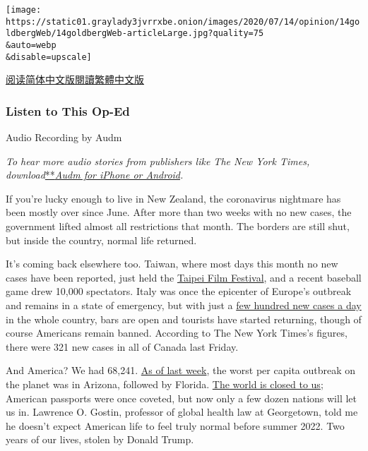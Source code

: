 \texttt{[image: https://static01.graylady3jvrrxbe.onion/images/2020/07/14/opinion/14goldbergWeb/14goldbergWeb-articleLarge.jpg?quality=75\\\&auto=webp\\\&disable=upscale]}

\href{https://cn.nytimes3xbfgragh.onion/opinion/20200714/us-coronavirus-trump/}{阅读简体中文版}\href{https://cn.nytimes3xbfgragh.onion/opinion/20200714/us-coronavirus-trump/zh-hant/}{閱讀繁體中文版}

\hypertarget{listen-to-this-op-ed}{%
\subsubsection{Listen to This Op-Ed}\label{listen-to-this-op-ed}}

Audio Recording by Audm

\emph{To hear more audio stories from publishers like The New York
Times,
download}\href{https://www.audm.com/?utm_source=nytmag\&utm_medium=embed\&utm_campaign=left_behind_draper}{**}\href{https://www.audm.com/?utm_source=nytopinion\&utm_medium=embed\&utm_campaign=countries_normal_life}{\emph{Audm
for iPhone or Android}}\emph{.}

If you're lucky enough to live in New Zealand, the coronavirus nightmare
has been mostly over since June. After more than two weeks with no new
cases, the government lifted almost all restrictions that month. The
borders are still shut, but inside the country, normal life returned.

It's coming back elsewhere too. Taiwan, where most days this month no
new cases have been reported, just held the
\href{https://www.startribune.com/asia-today-no-masks-on-red-carpet-as-taiwan-logs-few-cases/571731572/}{Taipei
Film Festival}, and a recent baseball game drew 10,000 spectators. Italy
was once the epicenter of Europe's outbreak and remains in a state of
emergency, but with just a
\href{https://www.nytimes3xbfgragh.onion/interactive/2020/world/europe/italy-coronavirus-cases.html}{few
hundred new cases a day} in the whole country, bars are open and
tourists have started returning, though of course Americans remain
banned. According to The New York Times's figures, there were 321 new
cases in all of Canada last Friday.

And America? We had 68,241.
\href{https://www.nytimes3xbfgragh.onion/2020/07/08/briefing/arizona-mary-trump-facebook-your-wednesday-briefing.html}{As
of last week}, the worst per capita outbreak on the planet was in
Arizona, followed by Florida.
\href{https://www.nytimes3xbfgragh.onion/2020/07/07/travel/american-travelers-restrictions-coronavirus.html}{The
world is closed to us}; American passports were once coveted, but now
only a few dozen nations will let us in. Lawrence O. Gostin, professor
of global health law at Georgetown, told me he doesn't expect American
life to feel truly normal before summer 2022. Two years of our lives,
stolen by Donald Trump.

